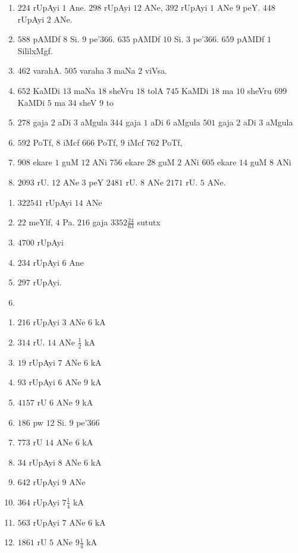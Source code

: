 \begin{enumerate}[$(1)$]
\item $224$ rUpAyi $1$ Ane. $298$ rUpAyi $12$ ANe, $392$ rUpAyi $1$
ANe $9$ peY. $448$ rUpAyi $2$ ANe.
\item $588$ pAMDf $8$ Si. $9$ pe\char'366. $635$ pAMDf $10$ Si. $3$
pe\char'366. $659$ pAMDf $1$ SililxMgf.
\item $462$ varahA. $505$ varaha $3$ maNa $2$ viVsa.
\item $652$ KaMDi $13$ maNa $18$ sheVru $18$ tolA $745$ KaMDi $18$ ma
$10$ sheVru $699$ KaMDi $5$ ma $34$ sheV $9$ to
\item $278$ gaja $2$ aDi $3$ aMgula $344$ gaja $1$ aDi $6$ aMgula
$501$ gaja $2$ aDi $3$ aMgula
\item $592$ PoTf, $8$ iMcf $666$ PoTf, $9$ iMcf $762$ PoTf,
\item $908$ ekare $1$ guM $12$ ANi $756$ ekare $28$ guM $2$ ANi $605$
ekare $14$ guM $8$ ANi
\item $2093$ rU. $12$ ANe $3$ peY $2481$ rU. $8$ ANe $2171$ rU. $5$ ANe.
\end{enumerate}


\begin{multicols}{2}
\begin{enumerate}[$(1)$]
\item $322541$ rUpAyi $14$ ANe
\item $22$ meYlf, $4$ Pa. $216$ gaja $3352\frac{24}{63}$ sututx
\item $4700$ rUpAyi
\item $234$ rUpAyi $6$ Ane
\item $297$ rUpAyi.
\item[]
\end{enumerate}
\end{multicols}


\begin{multicols}{3}
\begin{enumerate}[$(1)$]
\item $216$ rUpAyi $3$ ANe $6$ kA 
\item $314$ rU. $14$ ANe $\frac{1}{2}$ kA
\item $19$ rUpAyi $7$ ANe $6$ kA 
\item $93$ rUpAyi $6$ ANe $9$ kA
\item $4157$ rU $6$ ANe $9$ kA 
\item $186$ pw $12$ Si. $9$ pe\char'366 
\item $773$ rU $14$ ANe $6$ kA 
\item $34$ rUpAyi $8$ ANe $6$ kA
\item $642$ rUpAyi $9$ ANe 
\item $364$ rUpAyi $7 \frac{1}{4}$ kA
\item $563$ rUpAyi $7$ ANe $6$ kA  
\item $1861$ rU $5$ ANe $9 \frac{1}{4}$ kA
\end{enumerate}
\end{multicols}

